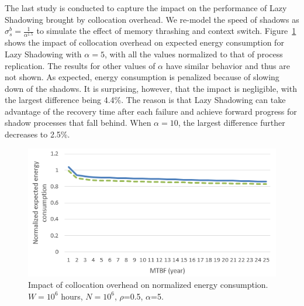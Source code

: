 The last study is conducted to capture the impact on the 
performance of Lazy Shadowing brought by 
collocation overhead. We re-model the speed of shadows as $\sigma_s^b=\frac{1}{\alpha^{1.5}}$ to simulate the 
effect of memory thrashing and context switch. 
Figure~\ref{fig:comp_vary_fail_speed} shows the impact of collocation overhead on expected energy consumption for Lazy Shadowing with $\alpha=5$, with all the values normalized to that of process replication. The results for other values of $\alpha$ have similar behavior and thus are not shown. As expected, energy consumption is penalized because
of slowing down of the shadows. It is surprising, however, that the impact is negligible, with the largest difference being 4.4\%. The reason is that Lazy Shadowing can take advantage of the recovery time after each failure and achieve forward progress for shadow processes that fall behind. When $\alpha=10$, the largest difference further decreases to 2.5\%. 


\begin{figure}[t]
	\begin{center}
		\includegraphics[width=\columnwidth]{Figures/collocation}
	\end{center}
	\caption{Impact of collocation overhead on normalized energy consumption. $W=10^6$ hours, $N=10^6$, $\rho$=0.5, $\alpha$=5.}
	\label{fig:comp_vary_fail_speed}
\end{figure}